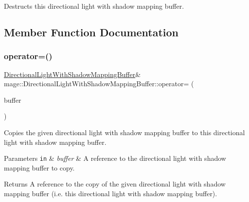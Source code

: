 Destructs this directional light with shadow mapping buffer. 

\subsection{Member Function Documentation}
\hypertarget{structmage_1_1_directional_light_with_shadow_mapping_buffer_a9a166d9ce2e74442b98e0d02bcbf18b8}{}\label{structmage_1_1_directional_light_with_shadow_mapping_buffer_a9a166d9ce2e74442b98e0d02bcbf18b8} 
\subsubsection{\texorpdfstring{operator=()}{operator=()}\hspace{0.1cm}{\footnotesize\ttfamily [1/2]}}
{\footnotesize\ttfamily \hyperlink{structmage_1_1_directional_light_with_shadow_mapping_buffer}{Directional\+Light\+With\+Shadow\+Mapping\+Buffer}\& mage\+::\+Directional\+Light\+With\+Shadow\+Mapping\+Buffer\+::operator= (\begin{DoxyParamCaption}\item[{const \hyperlink{structmage_1_1_directional_light_with_shadow_mapping_buffer}{Directional\+Light\+With\+Shadow\+Mapping\+Buffer} \&}]{buffer }\end{DoxyParamCaption})\hspace{0.3cm}{\ttfamily [default]}}

Copies the given directional light with shadow mapping buffer to this directional light with shadow mapping buffer.


\begin{DoxyParams}[1]{Parameters}
\mbox{\tt in}  & {\em buffer} & A reference to the directional light with shadow mapping buffer to copy. \\
\hline
\end{DoxyParams}
\begin{DoxyReturn}{Returns}
A reference to the copy of the given directional light with shadow mapping buffer (i.\+e. this directional light with shadow mapping buffer). 
\end{DoxyReturn}
\hypertarget{structmage_1_1_directional_light_with_shadow_mapping_buffer_a19765ecbd12d4f346269a22791d5347c}{}\label{structmage_1_1_directional_light_with_shadow_mapping_buffer_a19765ecbd12d4f346269a22791d5347c} 
